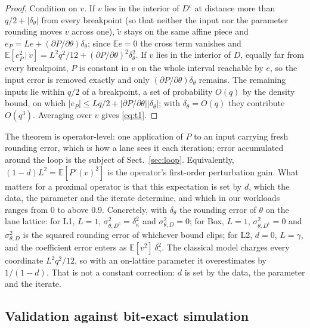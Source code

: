 \documentclass[conference]{IEEEtran}
\begin{document}
\begin{proof}
Condition on $v$. If $v$ lies in the interior of $D^c$ at distance more than
$q/2+|\delta_\theta|$ from every breakpoint (so that neither the input nor the
parameter rounding moves $v$ across one), $\tilde v$ stays on the same affine piece and
$e_P=Le+(\partial P/\partial\theta)\delta_\theta$; since $\mathbb{E}e=0$ the
cross term vanishes and $\mathbb{E}[e_P^2\,|\,v]=L^2q^2/12+(\partial P/\partial
\theta)^2\delta_\theta^2$. If $v$ lies in the interior of $D$, equally far from
every breakpoint, $P$ is constant in $v$ on the whole interval reachable by $e$, so
the input error is removed exactly and only
$(\partial P/\partial\theta)\delta_\theta$ remains. The remaining inputs lie
within $q/2$ of a breakpoint, a set of probability $O(q)$ by the density bound,
on which $|e_P|\le Lq/2+|\partial P/\partial\theta||\delta_\theta|$; with
$\delta_\theta=O(q)$ they contribute $O(q^3)$. Averaging over $v$ gives
\eqref{eq:t1}.
\end{proof}

The theorem is operator-level: one application of $P$ to an input carrying
fresh rounding error, which is how a lane sees it each iteration; error
accumulated around the loop is the subject of Sect.~\ref{sec:loop}. Equivalently,
$(1-d)L^2=\mathbb{E}[P'(v)^2]$ is the operator's first-order perturbation gain.
What matters for a proximal operator is that this expectation is set by $d$,
which the data, the parameter and the iterate determine, and which in our
workloads ranges from 0 to above 0.9. Concretely, with $\delta_\theta$ the
rounding error of $\theta$ on the lane lattice: for L1, $L=1$, $\sigma^2_{\theta,D^c}=\delta_\kappa^2$ and
$\sigma^2_{\theta,D}=0$; for Box, $L=1$, $\sigma^2_{\theta,D^c}=0$ and
$\sigma^2_{\theta,D}$ is the squared rounding error of whichever bound clips;
for L2, $d=0$, $L=\gamma$, and the coefficient error enters as
$\mathbb{E}[v^2]\,\delta_\gamma^2$. The classical model charges every
coordinate $L^2q^2/12$, so with an on-lattice parameter it overestimates by
$1/(1-d)$. That is not a constant
correction: $d$ is set by the data, the parameter and the iterate.

\subsection{Validation against bit-exact simulation}
\end{document}
